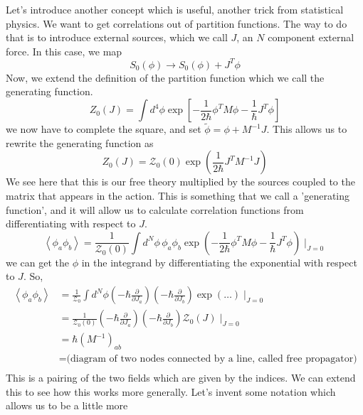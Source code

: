 \documentclass[11pt, oneside]{article}   	%
\theoremstyle{slanted}
\begin{document}
Let's introduce another 
concept which is useful, 
another trick from statistical physics. 
We want to get correlations out of partition functions. 
The way to do that is to introduce external sources, 
which we call $ J $, an $ N $ component external 
force. 
In this case, we map 
\[
	S _ 0 \left( \phi  \right)  \to S_ 0 \left( \phi  \right)  + J ^ T \phi 
\] Now, 
we extend the definition of the partition function 
which we call the generating function. 
\[
 Z_ 0 \left( J  \right)   = \int d ^ 4 \phi \exp 
 \left[   - \frac{1}{2 \hbar } \phi ^ T M \phi  - \frac{1}{\hbar} J ^ T \phi  \right] 
\] we now have to complete the square, 
and set $ \tilde{ \phi }  = \phi + M ^{  -1 } J  $. 
This allows us to rewrite the generating function as 
\[
	Z _ 0 \left( J  \right)   = \mathcal{ Z } _ 0 \left( 0  \right)  
	\exp \left( \frac{1}{2 \hbar } J ^ T M ^{ - 1} J  \right) 
\] We see here that this is 
our free theory multiplied by the 
sources coupled to the matrix that 
appears in the action. 
This is something that we call a 'generating function', and it will allow us to calculate correlation 
functions from differentiating with respect to $ J $. 
\[
	\left< \phi _ a \phi _ b  \right>  = \frac{1}{\mathcal{ Z } _ 0 \left( 0  \right)  } 
	\int d ^ N \phi \, \phi _ a \phi _ b \exp 
	\left(  - \frac{1}{2 \hbar} \phi ^ T M \phi  - \frac{1}{\hbar }
	J ^ T \phi \right) \mid_{ J = 0 }
\] we can get the $ \phi $ in the integrand by 
differentiating the exponential with respect to $ J $. 
So, 
\begin{align*}
 \left< \phi _ a \phi _ b  \right> &=  \frac{1}{\mathcal{ Z } _ 0 } 
 \int d ^ N \phi \left(   - \hbar \frac{\partial  }{\partial  J _ a }   \right)  
 \left(  - \hbar \frac{\partial  }{\partial  J_ b }   \right)  \exp \left( 
 \dots \right)  \mid_{ J = 0 } \\
				   &=  \frac{1}{ \mathcal{ Z } _ 0 \left( 0  \right)  } 
				   \left(  - \hbar \frac{\partial  }{\partial J_ a }  \right)
				   \left(  - \hbar \frac{\partial  }{\partial  J _ b }   \right)  \mathcal{ Z } _ 0 \left( J  \right)  \mid _{ J = 0 } \\
				   &=  \hbar \left( M ^{ - 1 }  \right) _{ ab }  \\
				   &=  \text{(diagram of two nodes 
				   connected by a line, called free propagator)} \\
\end{align*}
This is a pairing of the two fields
which are given by the indices. 
We can extend this 
to see how this works more generally. 
Let's invent some notation 
which allows us to be a little more 
\end{document}
